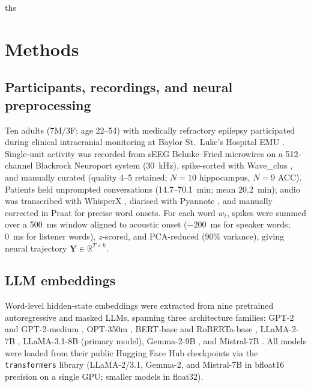 ths%

\section*{Methods}

\subsection*{Participants, recordings, and neural preprocessing}

Ten adults (7M/3F; age 22--54) with medically refractory epilepsy participated
during clinical intracranial monitoring at Baylor St.\ Luke's Hospital EMU
\citep{Xiao2024A,Xiao2024B}.
Single-unit activity was recorded from sEEG Behnke--Fried microwires on a
512-channel Blackrock Neuroport system (30~kHz), spike-sorted with Wave\_clus
\citep{Chaure2018}, and manually curated (quality 4--5 retained; $N=10$
hippocampus, $N=9$ ACC).
Patients held unprompted conversations (14.7--70.1~min; mean 20.2~min);
audio was transcribed with WhisperX \citep{Bain2023}, diarised with Pyannote
\citep{Bredin2021}, and manually corrected in Praat for precise word onsets.
For each word $w_t$, spikes were summed over a 500~ms window aligned to
acoustic onset ($-200$~ms for speaker words; 0~ms for listener words),
$z$-scored, and PCA-reduced (90\% variance), giving neural trajectory
$\mathbf{Y}\!\in\!\mathbb{R}^{T\times k}$.

\subsection*{LLM embeddings}

Word-level hidden-state embeddings were extracted from nine pretrained
autoregressive and masked LLMs, spanning three architecture families: GPT-2
and GPT-2-medium \citep{Radford2019}, OPT-350m \citep{Zhang2022}, BERT-base
\citep{Devlin2019} and RoBERTa-base \citep{Liu2019}, LLaMA-2-7B
\citep{Touvron2023}, LLaMA-3.1-8B \citep{Grattafiori2024} (primary model),
Gemma-2-9B \citep{GemmaTeam2024}, and Mistral-7B \citep{Jiang2023}. All models
were loaded from their public Hugging Face Hub checkpoints via the
\texttt{transformers} library \citep{Wolf2020} (LLaMA-2/3.1, Gemma-2, and
Mistral-7B in bfloat16 precision on a single GPU; smaller models in float32).

